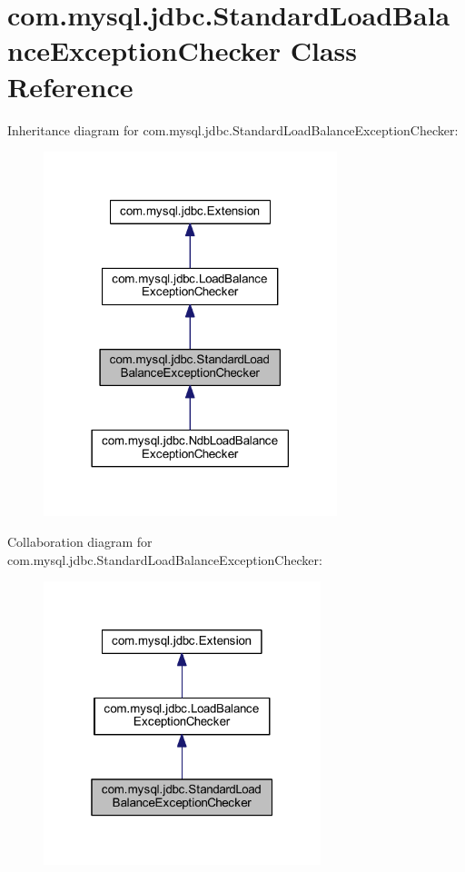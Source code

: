 \hypertarget{classcom_1_1mysql_1_1jdbc_1_1_standard_load_balance_exception_checker}{}\section{com.\+mysql.\+jdbc.\+Standard\+Load\+Balance\+Exception\+Checker Class Reference}
\label{classcom_1_1mysql_1_1jdbc_1_1_standard_load_balance_exception_checker}


Inheritance diagram for com.\+mysql.\+jdbc.\+Standard\+Load\+Balance\+Exception\+Checker\+:
\nopagebreak
\begin{figure}[H]
\begin{center}
\leavevmode
\includegraphics[width=242pt]{classcom_1_1mysql_1_1jdbc_1_1_standard_load_balance_exception_checker__inherit__graph}
\end{center}
\end{figure}


Collaboration diagram for com.\+mysql.\+jdbc.\+Standard\+Load\+Balance\+Exception\+Checker\+:
\nopagebreak
\begin{figure}[H]
\begin{center}
\leavevmode
\includegraphics[width=229pt]{classcom_1_1mysql_1_1jdbc_1_1_standard_load_balance_exception_checker__coll__graph}
\end{center}
\end{figure}
